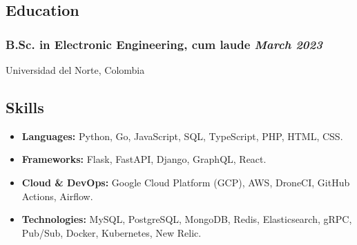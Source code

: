 \documentclass[a4paper,10pt]{article}
\begin{document}
\subsection*{Education}
\subsubsection*{\textbf{B.Sc. in Electronic Engineering, cum laude} \hfill \textit{March 2023}}
\noindent Universidad del Norte, Colombia

\subsection*{Skills}
\begin{itemize}
  \item \textbf{Languages:} Python, Go, JavaScript, SQL, TypeScript, PHP, HTML, CSS.
  \item \textbf{Frameworks:} Flask, FastAPI, Django, GraphQL, React.
  \item \textbf{Cloud \& DevOps:} Google Cloud Platform (GCP), AWS, DroneCI, GitHub Actions, Airflow.
  \item \textbf{Technologies:} MySQL, PostgreSQL, MongoDB, Redis, Elasticsearch, gRPC, Pub/Sub, Docker, Kubernetes, New Relic.
\end{itemize}

\end{document}
